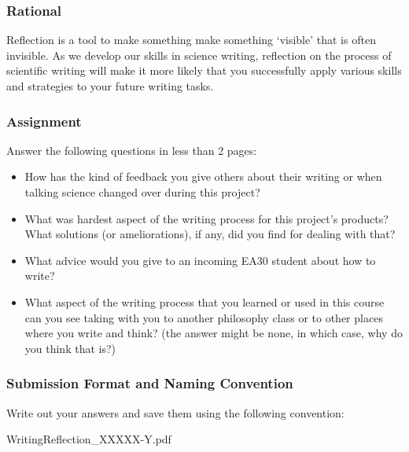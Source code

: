
\subsubsection{Rational}

Reflection is a tool to make something make something `visible' that is often invisible. As we develop our skills in science writing, reflection on the process of scientific writing will make it more likely that you successfully apply various skills and strategies to your future writing tasks. 

\subsubsection{Assignment}

Answer the following questions in less than 2 pages: 

\begin{itemize}
  \item How has the kind of feedback you give others about their writing or when talking science changed over during this project?

\item What was hardest aspect of the writing process for this project's products? What solutions (or ameliorations), if any, did you find for dealing with that? 

\item What advice would you give to an incoming EA30 student about how to write?

\item What aspect of the writing process that you learned or used in this course can you see taking with you to another philosophy class or to other places where you write and think? (the answer might be none, in which case, why do you think that is?)

\end{itemize}

\subsubsection{Submission Format and Naming Convention}

Write out your answers and save them using the following convention:

\begin{center}
WritingReflection\_XXXXX-Y.pdf
\end{center}

